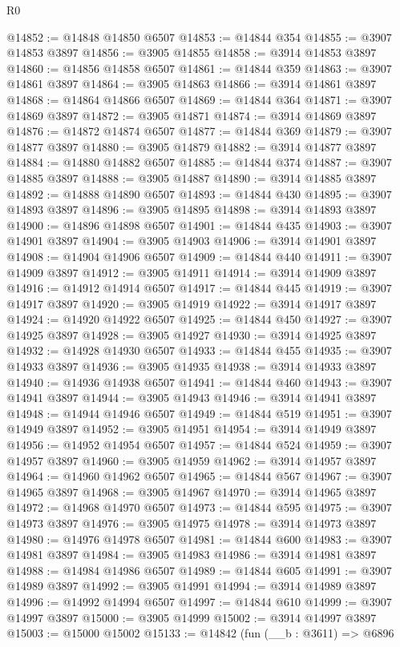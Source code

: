 \begin{lexlean}{R0}
\begin{coremodule}
@14852 := @14848 @14850 @6507
@14853 := @14844 @354
@14855 := @3907 @14853 @3897
@14856 := @3905 @14855
@14858 := @3914 @14853 @3897
@14860 := @14856 @14858 @6507
@14861 := @14844 @359
@14863 := @3907 @14861 @3897
@14864 := @3905 @14863
@14866 := @3914 @14861 @3897
@14868 := @14864 @14866 @6507
@14869 := @14844 @364
@14871 := @3907 @14869 @3897
@14872 := @3905 @14871
@14874 := @3914 @14869 @3897
@14876 := @14872 @14874 @6507
@14877 := @14844 @369
@14879 := @3907 @14877 @3897
@14880 := @3905 @14879
@14882 := @3914 @14877 @3897
@14884 := @14880 @14882 @6507
@14885 := @14844 @374
@14887 := @3907 @14885 @3897
@14888 := @3905 @14887
@14890 := @3914 @14885 @3897
@14892 := @14888 @14890 @6507
@14893 := @14844 @430
@14895 := @3907 @14893 @3897
@14896 := @3905 @14895
@14898 := @3914 @14893 @3897
@14900 := @14896 @14898 @6507
@14901 := @14844 @435
@14903 := @3907 @14901 @3897
@14904 := @3905 @14903
@14906 := @3914 @14901 @3897
@14908 := @14904 @14906 @6507
@14909 := @14844 @440
@14911 := @3907 @14909 @3897
@14912 := @3905 @14911
@14914 := @3914 @14909 @3897
@14916 := @14912 @14914 @6507
@14917 := @14844 @445
@14919 := @3907 @14917 @3897
@14920 := @3905 @14919
@14922 := @3914 @14917 @3897
@14924 := @14920 @14922 @6507
@14925 := @14844 @450
@14927 := @3907 @14925 @3897
@14928 := @3905 @14927
@14930 := @3914 @14925 @3897
@14932 := @14928 @14930 @6507
@14933 := @14844 @455
@14935 := @3907 @14933 @3897
@14936 := @3905 @14935
@14938 := @3914 @14933 @3897
@14940 := @14936 @14938 @6507
@14941 := @14844 @460
@14943 := @3907 @14941 @3897
@14944 := @3905 @14943
@14946 := @3914 @14941 @3897
@14948 := @14944 @14946 @6507
@14949 := @14844 @519
@14951 := @3907 @14949 @3897
@14952 := @3905 @14951
@14954 := @3914 @14949 @3897
@14956 := @14952 @14954 @6507
@14957 := @14844 @524
@14959 := @3907 @14957 @3897
@14960 := @3905 @14959
@14962 := @3914 @14957 @3897
@14964 := @14960 @14962 @6507
@14965 := @14844 @567
@14967 := @3907 @14965 @3897
@14968 := @3905 @14967
@14970 := @3914 @14965 @3897
@14972 := @14968 @14970 @6507
@14973 := @14844 @595
@14975 := @3907 @14973 @3897
@14976 := @3905 @14975
@14978 := @3914 @14973 @3897
@14980 := @14976 @14978 @6507
@14981 := @14844 @600
@14983 := @3907 @14981 @3897
@14984 := @3905 @14983
@14986 := @3914 @14981 @3897
@14988 := @14984 @14986 @6507
@14989 := @14844 @605
@14991 := @3907 @14989 @3897
@14992 := @3905 @14991
@14994 := @3914 @14989 @3897
@14996 := @14992 @14994 @6507
@14997 := @14844 @610
@14999 := @3907 @14997 @3897
@15000 := @3905 @14999
@15002 := @3914 @14997 @3897
@15003 := @15000 @15002
@15133 := @14842
    (fun (__b : @3611) =>
    @6896

\end{coremodule}
\end{lexlean}
